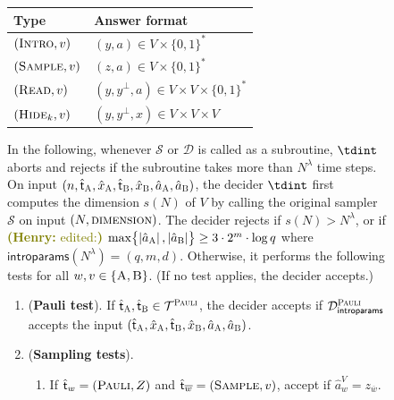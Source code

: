 \documentclass[11pt]{article}
\theoremstyle{definition}
\newcommand{\abs}[1]{\left\vert {#1} \right\vert}
\newcommand{\sampler}{\mathcal{S}}
\newcommand{\decider}{\mathcal{D}}
\newcommand{\type}{\mathcal{T}}
\newcommand{\gamestyle}[1]{\ensuremath{\textsc{#1}}\xspace}
\newcommand{\pauli}{\gamestyle{Pauli}}
\newcommand{\labelstyle}[1]{\ensuremath{\textsc{#1}}\xspace}
\newcommand{\tvarstyle}[1]{\mathsf{#1}}
\newcommand{\tvar}{\ensuremath{\tvarstyle{t}}}
\newcommand{\trole}{\ensuremath{v}}
\newcommand{\alice}{\labelstyle{A}}
\newcommand{\bob}{\labelstyle{B}}
\newcommand{\typestyle}[1]{\ensuremath{\textsc{#1}}\xspace}
\newcommand{\Pauli}{\typestyle{Pauli}}
\newcommand{\Sample}{\typestyle{Sample}}
\newcommand{\Read}{\typestyle{Read}}
\newcommand{\Hide}[1]{\typestyle{Hide}_{#1}}
\newcommand{\Introspect}{\typestyle{Intro}}
\newcommand{\AB}{\{\alice, \bob\}}
\newcommand{\introparams}{\mathsf{introparams}}
\newenvironment{gamespec}{
  \begin{mdframed}[style=figstyle]}{
  \end{mdframed}}
\newcommand{\hnote}[1]{\textcolor{olive}{\small {\textbf{(Henry:} #1\textbf{) }}}}
\newcommand{\hnote}[1]{}
\begin{document}
\begin{figure}[!htbp]
  \begin{gamespec}
    \begin{table}[H]
      \centering
      \small
      \begin{tabularx}{.7\textwidth}{l X}
        \toprule
        Type \hspace{6em} & Answer format\\
        \midrule
        $(\Introspect, \trole)$ & $(y,a) \in V \times \{0,1\}^*$ \\
        $(\Sample, \trole)$ &  $(z,a) \in V \times \{0,1\}^*$ \\
        $(\Read, \trole)$ & $(y,y^{\perp},a) \in V \times V \times \{0,1\}^*$\\
        $(\Hide{k}, \trole)$ & $(y,y^{\perp},x) \in V \times V \times V$\\
        \bottomrule
      \end{tabularx}
    \end{table}
    In the following, whenever $\sampler$ or $\decider$ is called as a subroutine,
    $\tdint$ aborts and rejects if the subroutine takes more than
    $N^\lambda$ time steps.
    On input $(n, \hat{\tvar}_\alice, \hat{x}_\alice, \hat{\tvar}_\bob,
    \hat{x}_\bob, \hat{a}_\alice, \hat{a}_\bob)$, the decider $\tdint$
    first computes the dimension $s(N)$ of $V$ by calling the original sampler
    $\sampler$ on input $(N,\gamestyle{dimension})$.
    The decider rejects if $s(N) > N^\lambda$, or if \hnote{edited:} $\max \bigl\{ \abs{\hat{a}_\alice},
    \abs{\hat{a}_\bob} \bigr\} \geq 3 \cdot 2^m \cdot \log q$ where $\introparams(N^\lambda) = (q,m,d)$. Otherwise, it performs the following tests for all $w,\trole \in \AB$.
    (If no test applies, the decider accepts.) 
    

\begin{enumerate}[itemsep=2pt, parsep=2pt]
    \item (\textbf{Pauli test}).
      \label{enu:pauli}
      If $\hat{\tvar}_\alice, \hat{\tvar}_\bob \in \type^\pauli$, the decider
      accepts if $\decider^\pauli_\introparams$ accepts the input
      $(\hat{\tvar}_\alice, \hat{x}_\alice, \hat{\tvar}_\bob, \hat{x}_\bob,
      \hat{a}_\alice, \hat{a}_\bob)$.
    \item (\textbf{Sampling tests}).
      \label{enu:sampling}
      \begin{enumerate}
      \item If $\hat{\tvar}_w = (\Pauli,Z)$ and $\hat{\tvar}_{\overline{w}} =
        (\Sample, \trole)$, accept if $\hat{a}_w^V = z_{\overline{w}}$.
        \label{enu:sampling-pauli}


\end{enumerate}
\end{enumerate}
\end{gamespec}
\end{figure}
\end{document}
